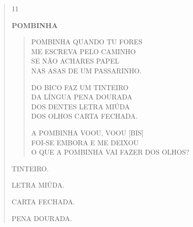 \begin{escola}
{\begin{verse}



\num{11}

\textbf{POMBINHA}

\begin{verse}
POMBINHA QUANDO TU FORES\\
ME ESCREVA PELO CAMINHO\\
SE NÃO ACHARES PAPEL\\
NAS ASAS DE UM PASSARINHO.

DO BICO FAZ UM TINTEIRO\\
DA LÍNGUA PENA DOURADA\\
DOS DENTES LETRA MIÚDA\\
DOS OLHOS CARTA FECHADA.

A POMBINHA VOOU, VOOU {[}BIS{]}\\
FOI-SE EMBORA E ME DEIXOU\\
O QUE A POMBINHA VAI FAZER DOS OLHOS?
\end{verse}

\begin{escolha}
\item TINTEIRO.

\item LETRA MIÚDA.

\item CARTA FECHADA.

\item PENA DOURADA.
\end{escolha}

\end{verse}}
\end{escola}
